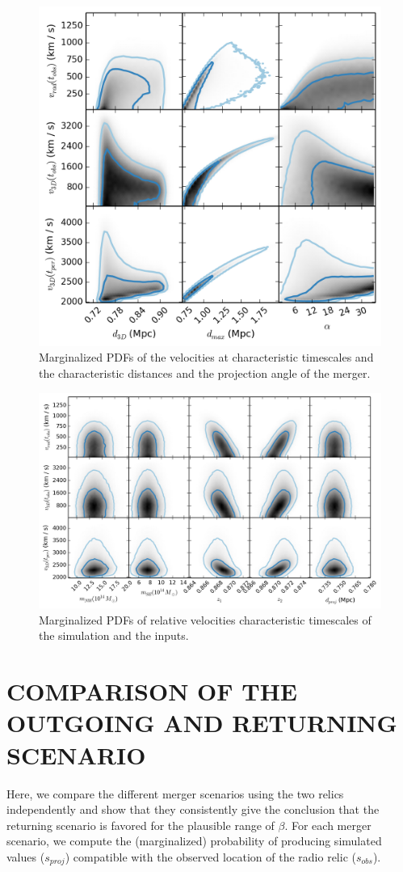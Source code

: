 \documentclass[letterpaper,useAMS,usenatbib]{mn2e}
\begin{document}
\begin{figure}
\begin{minipage}{180mm}
	\begin{center}
	\includegraphics[width=0.5\linewidth]{TwoMnWBSG_velVSgeo.png}
	\caption{Marginalized PDFs of the velocities at characteristic timescales
		and the characteristic distances and the projection angle of the merger. }
	\end{center}
\end{minipage}
\end{figure}
\begin{figure}
\begin{minipage}{180mm}
	\begin{center}
	\includegraphics[width=0.7\linewidth]{TwoMnWBSG_velVSinputs.png}
	\caption{Marginalized PDFs of relative velocities characteristic
	timescales of the simulation and the inputs.}
	\end{center}
\end{minipage}
\end{figure}

\section{COMPARISON OF THE OUTGOING AND RETURNING SCENARIO}
\label{app:Bayes_factor}
Here, we compare the different merger scenarios using the two relics
independently and show that they consistently give the conclusion that the returning
scenario is favored for the plausible range of $\beta$. For each merger
scenario, we compute
the (marginalized) probability of producing simulated
values ($s_{proj}$) compatible with the observed location of the radio
relic ($s_{obs}$). 
\end{document}
